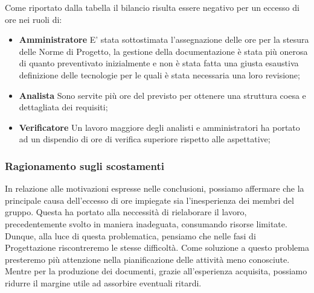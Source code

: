 Come riportato dalla tabella il bilancio risulta essere negativo per un eccesso di ore nei ruoli di:
\begin{itemize}
	\item \textbf{Amministratore} E' stata sottostimata l'assegnazione delle ore per la stesura delle Norme di Progetto, la gestione della documentazione è stata più onerosa di quanto preventivato inizialmente e non è stata fatta una giusta esaustiva definizione delle tecnologie per le quali è stata necessaria una loro revisione;
	\item \textbf{Analista} Sono servite più ore del previsto per ottenere una struttura coesa e dettagliata dei requisiti;
	\item \textbf{Verificatore} Un lavoro maggiore degli analisti e amministratori ha portato ad un dispendio di ore di verifica superiore rispetto alle aspettative;
\end{itemize}

\subsubsection{Ragionamento sugli scostamenti}
In relazione alle motivazioni espresse nelle conclusioni, possiamo affermare che la principale causa dell'eccesso di ore impiegate sia l'inesperienza dei membri del gruppo. 
Questa ha portato alla neccessità di rielaborare il lavoro, precedentemente svolto in maniera inadeguata, consumando risorse limitate.
Dunque, alla luce di questa problematica, pensiamo che nelle fasi di Progettazione riscontreremo le stesse difficoltà. Come soluzione a questo problema presteremo più attenzione nella pianificazione delle attività meno conosciute. Mentre per la produzione dei documenti, grazie all'esperienza acquisita, possiamo ridurre il margine utile ad assorbire eventuali ritardi.


